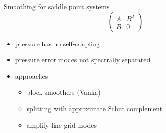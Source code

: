 \begin{frame}{Smoothing for saddle point systems}
  \[ \begin{pmatrix}
    A & B^T \\ B & 0
  \end{pmatrix} \]
  \begin{itemize}
  \item pressure has no self-coupling
  \item pressure error modes not spectrally separated
  \item approaches
    \begin{itemize}
    \item block smoothers (Vanka)
    \item splitting with approximate Schur complement
    \item amplify fine-grid modes
    \end{itemize}
  \end{itemize}
\end{frame}
